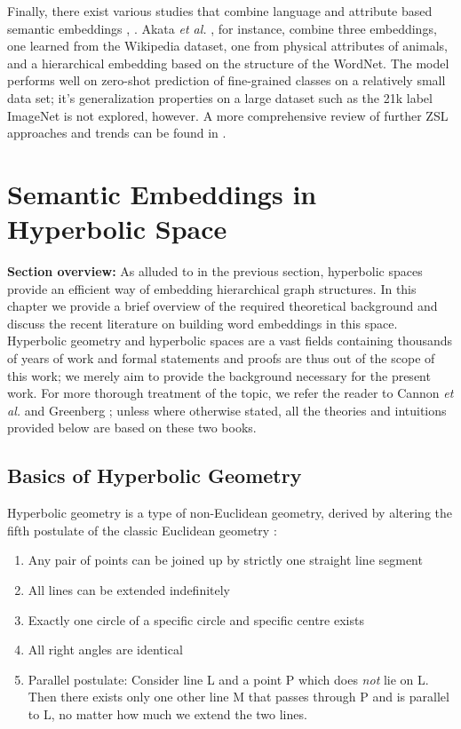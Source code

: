 \documentclass[12pt]{report}
\begin{document}
Finally, there exist various studies that combine language and attribute based semantic embeddings \cite{Akata2015}, \cite{Fu2015} \cite{Zhou2005}. Akata \textit{et al.} \cite{Akata2015}, for instance, combine three embeddings, one learned from the Wikipedia dataset, one from physical attributes of animals, and a hierarchical embedding based on the structure of the WordNet. The model performs well on zero-shot prediction of fine-grained classes on a relatively small data set; it's generalization properties on a large dataset such as the 21k label ImageNet is not explored, however. A more comprehensive review of further ZSL approaches and trends can be found in \cite{Xian2017}.


\section{Semantic Embeddings in Hyperbolic Space}

\textbf{Section overview:} As alluded to in the previous section, hyperbolic spaces provide an efficient way of embedding hierarchical graph structures. In this chapter we provide a brief overview of the required theoretical background and discuss the recent literature on building word embeddings in this space. Hyperbolic geometry and hyperbolic spaces are a vast fields containing thousands of years of work and formal statements and proofs are thus out of the scope of this work; we merely aim to provide the background necessary for the present work. For more thorough treatment of the topic, we refer the reader to Cannon \textit{et al.} \cite{} and Greenberg \cite{Greenberg1994}; unless where otherwise stated, all the theories and intuitions provided below are based on these two books.

\subsection{Basics of Hyperbolic Geometry}
Hyperbolic geometry is a type of non-Euclidean geometry, derived by altering the fifth postulate of the classic Euclidean geometry \cite{Greenberg1994}:
\begin{enumerate}
    \item Any pair of points can be joined up by strictly one straight line segment
    \item All lines can be extended indefinitely
    \item Exactly one circle of a specific circle and specific centre exists
    \item All right angles are identical
    \item Parallel postulate: Consider line L and a point P which does \textit{not} lie on L. Then there exists only one other line M that passes through P and is parallel to L, no matter how much we extend the two lines.
\end{enumerate}
\end{document}
